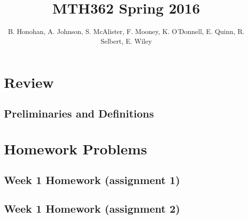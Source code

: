 \documentclass[12pt]{amsbook}
\theoremstyle{plain}
\numberwithin{section}{chapter}
\begin{document}
\title{MTH362 Spring 2016}
\maketitle
\author{B. Honohan, A. Johnson, S. McAlister, F. Mooney, K. O'Donnell, E. Quinn, R. Selbert, E. Wiley}
\setcounter{tocdepth}{4} 
\tableofcontents
\mainmatter 
\chapter{Review}
\section{Preliminaries and Definitions}


\chapter{Homework Problems}
\section{Week 1 Homework (assignment 1)}

\section{Week 1 Homework (assignment 2)}

\end{document}
